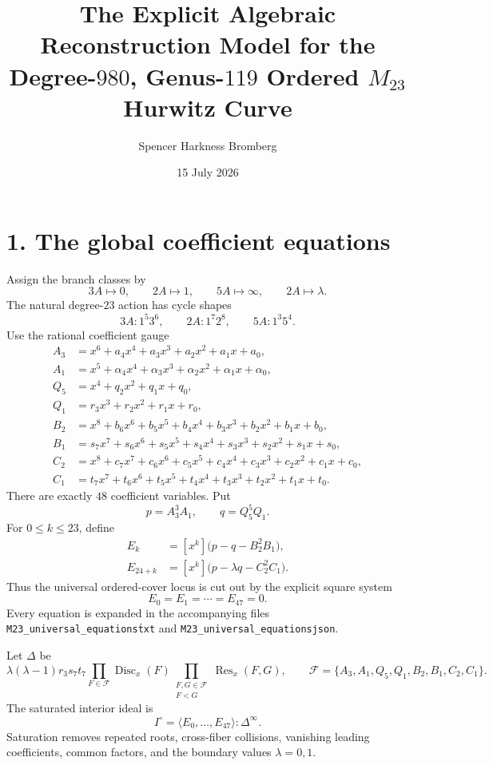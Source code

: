 \documentclass[11pt]{article}
\title{The Explicit Algebraic Reconstruction Model for the\\Degree-$980$, Genus-$119$ Ordered $M_{23}$ Hurwitz Curve}
\author{Spencer Harkness Bromberg}
\date{15 July 2026}
\newcommand{\Res}{\operatorname{Res}}
\newcommand{\Disc}{\operatorname{Disc}}
\begin{document}
\maketitle

\section*{1. The global coefficient equations}
Assign the branch classes by
\[
 3A\mapsto0,\qquad 2A\mapsto1,\qquad 5A\mapsto\infty,
 \qquad 2A\mapsto\lambda.
\]
The natural degree-$23$ action has cycle shapes
\[
 3A:1^5 3^6,\qquad 2A:1^7 2^8,\qquad 5A:1^3 5^4.
\]
Use the rational coefficient gauge
\begin{align*}
 A_3&=x^6+a_4x^4+a_3x^3+a_2x^2+a_1x+a_0,\\
 A_1&=x^5+\alpha_4x^4+\alpha_3x^3+\alpha_2x^2+\alpha_1x+\alpha_0,\\
 Q_5&=x^4+q_2x^2+q_1x+q_0,\\
 Q_1&=r_3x^3+r_2x^2+r_1x+r_0,\\
 B_2&=x^8+b_6x^6+b_5x^5+b_4x^4+b_3x^3+b_2x^2+b_1x+b_0,\\
 B_1&=s_7x^7+s_6x^6+s_5x^5+s_4x^4+s_3x^3+s_2x^2+s_1x+s_0,\\
 C_2&=x^8+c_7x^7+c_6x^6+c_5x^5+c_4x^4+c_3x^3+c_2x^2+c_1x+c_0,\\
 C_1&=t_7x^7+t_6x^6+t_5x^5+t_4x^4+t_3x^3+t_2x^2+t_1x+t_0.
\end{align*}
There are exactly $48$ coefficient variables.  Put
\[
 p=A_3^3A_1,\qquad q=Q_5^5Q_1.
\]
For $0\le k\le23$, define
\begin{align*}
 E_k&=[x^k]\bigl(p-q-B_2^2B_1\bigr),\\
 E_{24+k}&=[x^k]\bigl(p-\lambda q-C_2^2C_1\bigr).
\end{align*}
Thus the universal ordered-cover locus is cut out by the explicit square system
\[
 \boxed{E_0=E_1=\cdots=E_{47}=0.}
\]
Every equation is expanded in the accompanying files
\texttt{M23\_universal\_equations\.txt} and
\texttt{M23\_universal\_equations\.json}.

Let $\Delta$ be
\[
 \lambda(\lambda-1)r_3s_7t_7
 \prod_{F\in\mathcal F}\Disc_x(F)
 \prod_{\substack{F,G\in\mathcal F\\F<G}}\Res_x(F,G),
 \qquad
 \mathcal F=\{A_3,A_1,Q_5,Q_1,B_2,B_1,C_2,C_1\}.
\]
The saturated interior ideal is
\[
 I^{\circ}=\langle E_0,\ldots,E_{47}\rangle:\Delta^\infty.
\]
Saturation removes repeated roots, cross-fiber collisions, vanishing leading
coefficients, common factors, and the boundary values $\lambda=0,1$.
\end{document}
